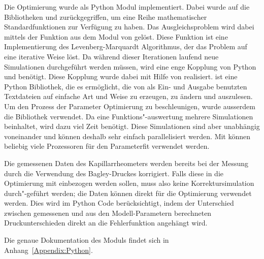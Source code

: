 Die Optimierung wurde als Python Modul  implementiert. Dabei wurde auf die Bibliotheken  und  \cite{scipy} zurückgegriffen, um eine Reihe mathematischer Standardfunktionen zur Verfügung zu haben.
Das Ausgleichsproblem wird dabei mittels der Funktion  aus dem Modul  von  gelöst.
Diese Funktion ist eine Implementierung des Levenberg-Marquardt Algorithmus, der das Problem auf eine iterative Weise löst.
Da während dieser Iterationen laufend neue Simulationen durchgeführt werden müssen, wird eine enge Kopplung von Python und \openfoam{} benötigt.
Diese Kopplung wurde dabei mit Hilfe von  \cite{pyfoam} realisiert.  ist eine Python Bibliothek, die es ermöglicht, die von \openfoam{} als Ein- und Ausgabe benutzten Textdateien auf einfache Art und Weise zu erzeugen, zu ändern und auszulesen.
Um den Prozess der Parameter Optimierung zu beschleunigen, wurde ausserdem die Bibliothek  \cite{parallelpython} verwendet. Da eine Funktions"-auswertung mehrere Simulationen beinhaltet, wird dazu viel Zeit benötigt. Diese Simulationen sind aber unabhängig voneinander und können deshalb sehr einfach parallelisiert werden. Mit  können beliebig viele Prozessoren für den Parameterfit verwendet werden.

Die gemessenen Daten des Kapillarrheometers werden bereits bei der Messung durch die Verwendung des Bagley-Druckes korrigiert.
Falls diese in die Optimierung mit einbezogen werden sollen, muss also keine Korrektur\-simulation durch"-geführt werden; die Daten können direkt für die Optimierung verwendet werden. 
Dies wird im Python Code berücksichtigt, indem der Unterschied zwischen gemessenen und aus den Modell-Parametern berechneten Druckunterschieden direkt an die Fehlerfunktion angehängt wird.

Die genaue Dokumentation des  Moduls findet sich in Anhang~\ref{Appendix:Python}.
%
